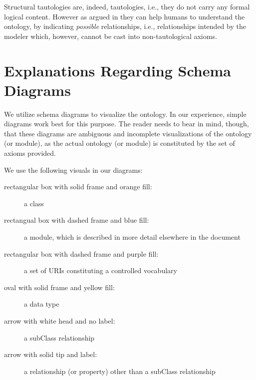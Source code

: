 Structural tautologies are, indeed, tautologies, i.e., they do not carry any formal logical content. However as argued in \cite{HitzlerK16} they can help humans to understand the ontology, by indicating \emph{possible} relationships, i.e., relationships intended by the modeler which, however, cannot be cast into non-tautological axioms.

\section*{Explanations Regarding Schema Diagrams}

We utilize schema diagrams to visualize the ontology. In our experience, simple diagrams work best for this purpose. The reader needs to bear in mind, though, that these diagrams are ambiguous and incomplete visualizations of the ontology (or module), as the actual ontology (or module) is constituted by the set of axioms provided. 

We use the following visuals in our diagrams:

\begin{description}
\item[rectangular box with solid frame and orange fill:] a class
\item[rectangual box with dashed frame and blue fill:] a module, which is described in more detail elsewhere in the document
\item[rectangular box with dashed frame and purple fill:] a set of URIs constituting a controlled vocabulary
\item[oval with solid frame and yellow fill:] a data type
\item[arrow with white head and no label:] a subClass relationship
\item[arrow with solid tip and label:] a relationship (or property) other than a subClass relationship
\end{description}

